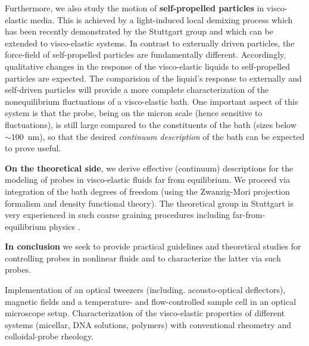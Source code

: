 \begin{workpackage}
\begin{wpdescription}
Furthermore, we also study the motion of {\bf self-propelled particles} in visco-elastic media. This is achieved by a light-induced local demixing process which has been recently demonstrated by the Stuttgart group \cite{kuemmel2013, buttinoni2013, tenHagen2014} and which can be extended to visco-elastic systems. In contrast to externally driven particles, the force-field of self-propelled particles are fundamentally different. Accordingly, qualitative changes in the response of the visco-elastic liquids to self-propelled particles are expected. The comparision of the liquid's response to externally and self-driven particles will provide a more complete characterization of the
nonequilibrium fluctuations of a visco-elastic bath. One important aspect of this system is that the
probe, being on the micron scale (hence sensitive to fluctuations), is still large compared
to the constituents of the bath (sizes below $\sim 100$~nm), so that the desired {\it
  continuum description} of the bath can be expected to prove useful.

{\bf On the theoretical side}, we derive effective (continuum) descriptions for the
modeling of probes in visco-elastic fluids far from equilibrium. We proceed via
integration of the bath degrees of freedom (using the Zwanzig-Mori projection formalism and
density functional theory).
%
The theoretical group in Stuttgart is very experienced in such coarse graining procedures
\cite{Aerov14} including far-from-equilibrium physics \cite{Kruger11,Kruger09}.

{\bf In conclusion} we seek to provide practical guidelines and theoretical studies for controlling probes in nonlinear fluids and to characterize the latter via such probes.



\printbibliography[heading=proposal-bib,env=proposal-env]

\end{wpdescription}

\begin{tasklist}

\begin{task}[title=Experimental setup,id=brown-t1,PM=24,lead=USTUTT,wphases=0-24!0.5]
Implementation of an optical tweezers (including. acousto-optical deflectors), magnetic fields and a temperature- and flow-controlled sample cell in an optical microscope setup. Characterization of the visco-elastic properties of different systems (micellar, DNA solutions, polymers) with conventional rheometry and colloidal-probe rheology. 
\end{task}



\end{tasklist}
\end{workpackage}
